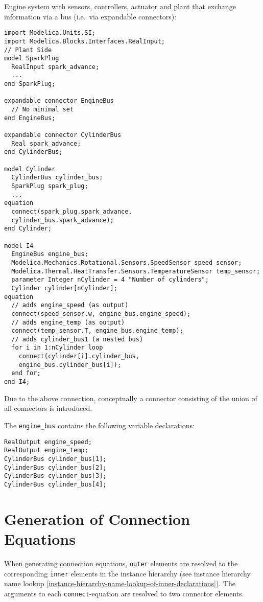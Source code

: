 \begin{example}
Engine system with sensors, controllers, actuator and plant that
exchange information via a bus (i.e.\ via expandable connectors):
\begin{lstlisting}[language=modelica]
import Modelica.Units.SI;
import Modelica.Blocks.Interfaces.RealInput;
// Plant Side
model SparkPlug
  RealInput spark_advance;
  ...
end SparkPlug;

expandable connector EngineBus
  // No minimal set
end EngineBus;

expandable connector CylinderBus
  Real spark_advance;
end CylinderBus;

model Cylinder
  CylinderBus cylinder_bus;
  SparkPlug spark_plug;
  ...
equation
  connect(spark_plug.spark_advance,
  cylinder_bus.spark_advance);
end Cylinder;

model I4
  EngineBus engine_bus;
  Modelica.Mechanics.Rotational.Sensors.SpeedSensor speed_sensor;
  Modelica.Thermal.HeatTransfer.Sensors.TemperatureSensor temp_sensor;
  parameter Integer nCylinder = 4 "Number of cylinders";
  Cylinder cylinder[nCylinder];
equation
  // adds engine_speed (as output)
  connect(speed_sensor.w, engine_bus.engine_speed);
  // adds engine_temp (as output)
  connect(temp_sensor.T, engine_bus.engine_temp);
  // adds cylinder_bus1 (a nested bus)
  for i in 1:nCylinder loop
    connect(cylinder[i].cylinder_bus,
    engine_bus.cylinder_bus[i]);
  end for;
end I4;
\end{lstlisting}
Due to the above connection, conceptually a connector consisting
of the union of all connectors is introduced.

The \lstinline!engine_bus! contains the following variable declarations:
\begin{lstlisting}[language=modelica]
RealOutput engine_speed;
RealOutput engine_temp;
CylinderBus cylinder_bus[1];
CylinderBus cylinder_bus[2];
CylinderBus cylinder_bus[3];
CylinderBus cylinder_bus[4];
\end{lstlisting}
\end{example}

\section{Generation of Connection Equations}\label{generation-of-connection-equations}

When generating connection equations, \lstinline!outer! elements are resolved to the
corresponding \lstinline!inner! elements in the instance hierarchy (see instance
hierarchy name lookup \cref{instance-hierarchy-name-lookup-of-inner-declarations}). The arguments to each \lstinline!connect!-equation are
resolved to two connector elements.

